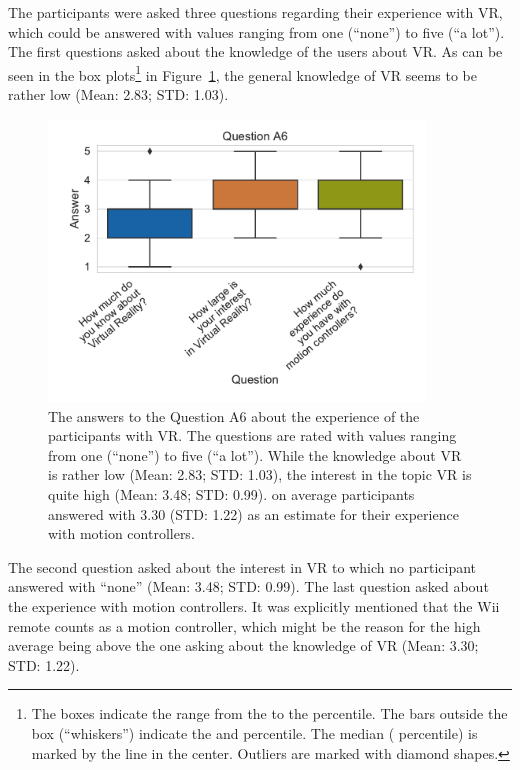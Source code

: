 The participants were asked three questions regarding their experience with \gls{VR}, which could be answered with values ranging from one (\enquote{none}) to five (\enquote{a lot}). The first questions asked about the knowledge of the users about \gls{VR}. As can be seen in the box plots\footnote{The boxes indicate the range from the  to the  percentile. The bars outside the box (\enquote{whiskers}) indicate the  and  percentile. The median ( percentile) is marked by the line in the center. Outliers are marked with diamond shapes.} in Figure~\ref{fig:res-demo-q9}, the general knowledge of \gls{VR} seems to be rather low (Mean: 2.83; \gls{STD}: 1.03).

\begin{figure}[H]
	\centering
	\includegraphics[width=10cm]{figures/evaluation/res_demo_q9.pdf}
	\caption[VR experience of the participants]{The answers to the Question A6 about the experience of the participants with \gls{VR}. The questions are rated with values ranging from one (\enquote{none}) to five (\enquote{a lot}). While the knowledge about \gls{VR} is rather low (Mean: 2.83; \gls{STD}: 1.03), the interest in the topic \gls{VR} is quite high (Mean: 3.48; \gls{STD}: 0.99). on average participants answered with 3.30 (\gls{STD}: 1.22) as an estimate for their experience with motion controllers.}\label{fig:res-demo-q9}
\end{figure}

The second question asked about the interest in \gls{VR} to which no participant answered with \enquote{none} (Mean: 3.48; \gls{STD}: 0.99). The last question asked about the experience with motion controllers. It was explicitly mentioned that the Wii remote counts as a motion controller, which might be the reason for the high average being above the one asking about the knowledge of \gls{VR} (Mean: 3.30; \gls{STD}: 1.22).


